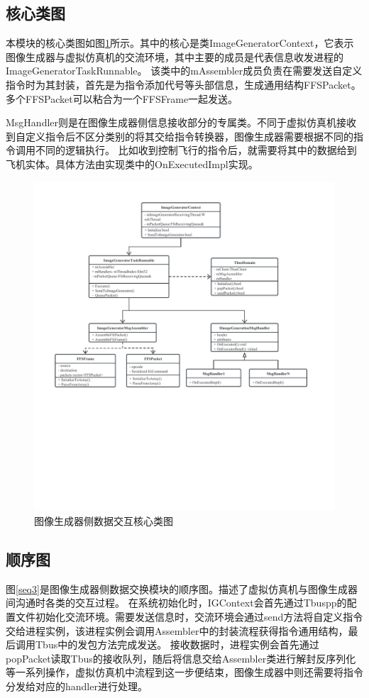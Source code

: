 \subsection{核心类图}

本模块的核心类图如图\ref{module32}所示。其中的核心是类ImageGeneratorContext，它表示图像生成器与虚拟仿真机的交流环境，其中主要的成员是代表信息收发进程的ImageGeneratorTaskRunnable。
该类中的mAssembler成员负责在需要发送自定义指令时为其封装，首先是为指令添加代号等头部信息，生成通用结构FFSPacket。多个FFSPacket可以粘合为一个FFSFrame一起发送。
\par
MsgHandler则是在图像生成器侧信息接收部分的专属类。不同于虚拟仿真机接收到自定义指令后不区分类别的将其交给指令转换器，图像生成器需要根据不同的指令调用不同的逻辑执行。
比如收到控制飞行的指令后，就需要将其中的数据给到飞机实体。具体方法由实现类中的OnExecutedImpl实现。
\begin{figure}[h!]
    \begin{center}
        \includegraphics[width=\textwidth]{pictures/classdiagram3.pdf}
        \caption{图像生成器侧数据交互核心类图}
        \label{module32}
    \end{center}
\end{figure}
\subsection{顺序图}
图\ref{seq3}是图像生成器侧数据交换模块的顺序图。描述了虚拟仿真机与图像生成器间沟通时各类的交互过程。
在系统初始化时，IGContext会首先通过Tbuspp的配置文件初始化交流环境。需要发送信息时，交流环境会通过send方法将自定义指令交给进程实例，该进程实例会调用Assembler中的封装流程获得指令通用结构，最后调用Tbus中的发包方法完成发送。
接收数据时，进程实例会首先通过popPacket读取Tbus的接收队列，随后将信息交给Assembler类进行解封反序列化等一系列操作，虚拟仿真机中流程到这一步便结束，图像生成器中则还需要将指令分发给对应的handler进行处理。

